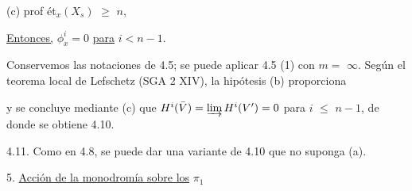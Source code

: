 (c)  prof ét$_x(X_s)$ $\geqslant$ $n$,

\underline{Entonces,} $\phi^i_x = 0$ \underline{para} $i < n-1$.

Conservemos las notaciones de 4.5; se puede aplicar 4.5 (1) con $m =$ $\infty$. Según el teorema local de Lefschetz (SGA 2 XIV), la hipótesis (b) proporciona

\begin{center}
\end{center}
y se concluye mediante (c) que $H^i(\bar{V}) = \varinjlim H^i(V') = 0$ para $i$ $\leqslant$ $n-1$, de donde se obtiene 4.10.

4.11.  Como en 4.8, se puede dar una variante de 4.10 que no suponga (a).



5.  \underline{Acción de la monodromía sobre los} $\pi_1$

